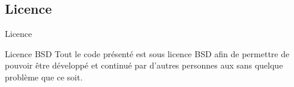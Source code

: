 \subsection{Licence}
\begin{frame}{Licence}
	\begin{block}{Licence BSD}
        Tout le code présenté est sous licence BSD afin de permettre de pouvoir
        être développé et continué par d'autres personnes aux sans quelque
        problème que ce soit.
	\end{block}
\end{frame}

